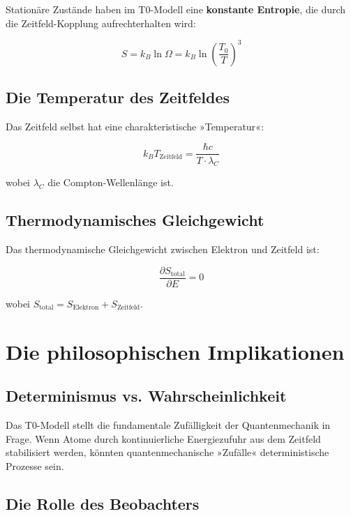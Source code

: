 \documentclass[12pt,a4paper]{report}
\begin{document}
	Stationäre Zustände haben im T0-Modell eine \textbf{konstante Entropie}, die durch die Zeitfeld-Kopplung aufrechterhalten wird:
	
	\begin{equation}
		S = k_B \ln \Omega = k_B \ln\left(\frac{T_0}{T}\right)^3
	\end{equation}
	
	\subsection{Die Temperatur des Zeitfeldes}
	
	Das Zeitfeld selbst hat eine charakteristische »Temperatur«:
	
	\begin{equation}
		k_B T_{\text{Zeitfeld}} = \frac{\hbar c}{T \cdot \lambda_C}
	\end{equation}
	
	wobei $\lambda_C$ die Compton-Wellenlänge ist.
	
	\subsection{Thermodynamisches Gleichgewicht}
	
	Das thermodynamische Gleichgewicht zwischen Elektron und Zeitfeld ist:
	
	\begin{equation}
		\frac{\partial S_{\text{total}}}{\partial E} = 0
	\end{equation}
	
	wobei $S_{\text{total}} = S_{\text{Elektron}} + S_{\text{Zeitfeld}}$.
	
	\section{Die philosophischen Implikationen}
	
	\subsection{Determinismus vs. Wahrscheinlichkeit}
	
	Das T0-Modell stellt die fundamentale Zufälligkeit der Quantenmechanik in Frage. Wenn Atome durch kontinuierliche Energiezufuhr aus dem Zeitfeld stabilisiert werden, könnten quantenmechanische »Zufälle« deterministische Prozesse sein.
	
	\subsection{Die Rolle des Beobachters}
	
\end{document}
